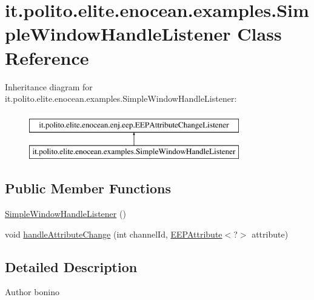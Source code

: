\hypertarget{classit_1_1polito_1_1elite_1_1enocean_1_1examples_1_1_simple_window_handle_listener}{}\section{it.\+polito.\+elite.\+enocean.\+examples.\+Simple\+Window\+Handle\+Listener Class Reference}
\label{classit_1_1polito_1_1elite_1_1enocean_1_1examples_1_1_simple_window_handle_listener}
Inheritance diagram for it.\+polito.\+elite.\+enocean.\+examples.\+Simple\+Window\+Handle\+Listener\+:\begin{figure}[H]
\begin{center}
\leavevmode
\includegraphics[height=2.000000cm]{classit_1_1polito_1_1elite_1_1enocean_1_1examples_1_1_simple_window_handle_listener}
\end{center}
\end{figure}
\subsection*{Public Member Functions}
\begin{DoxyCompactItemize}
\item 
\hyperlink{classit_1_1polito_1_1elite_1_1enocean_1_1examples_1_1_simple_window_handle_listener_a0729c3be0ddc941da604e49bd8d75ff4}{Simple\+Window\+Handle\+Listener} ()
\item 
void \hyperlink{classit_1_1polito_1_1elite_1_1enocean_1_1examples_1_1_simple_window_handle_listener_a39176a5ebe41a14b797c532232dfb7fe}{handle\+Attribute\+Change} (int channel\+Id, \hyperlink{classit_1_1polito_1_1elite_1_1enocean_1_1enj_1_1eep_1_1_e_e_p_attribute}{E\+E\+P\+Attribute}$<$?$>$ attribute)
\end{DoxyCompactItemize}


\subsection{Detailed Description}
\begin{DoxyAuthor}{Author}
bonino 
\end{DoxyAuthor}


